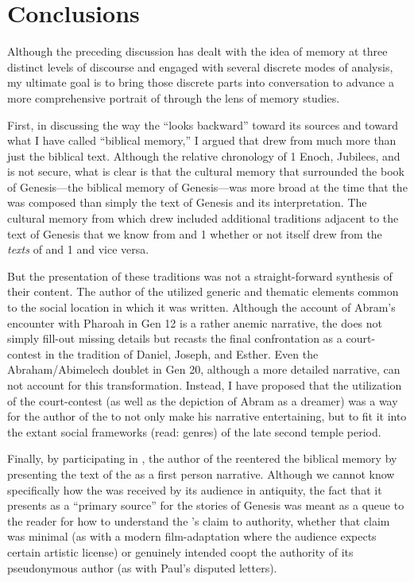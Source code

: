 \section{Conclusions}

Although the preceding discussion has dealt with the idea of memory at three distinct levels of discourse and engaged with several discrete modes of analysis, my ultimate goal is to bring those discrete parts into conversation to advance a more comprehensive portrait of \ga through the lens of memory studies.

First, in discussing the way the \ga ``looks backward'' toward its sources and toward what I have called ``biblical memory,'' I argued that \ga drew from much more than just the biblical text. Although the relative chronology of 1 Enoch, Jubilees, and \ga is not secure, what is clear is that the cultural memory that surrounded the book of Genesis---the biblical memory of Genesis---was more broad at the time that the \ga was composed than simply the text of Genesis and its interpretation. The cultural memory from which \ga drew included additional traditions adjacent to the text of Genesis that we know from \jub and 1 \enoch whether or not \ga itself drew from the \emph{texts} of \jub and 1 \enoch and vice versa.

But the presentation of these traditions was not a straight-forward synthesis of their content. The author of the \ga utilized generic and thematic elements common to the social location in which it was written. Although the account of Abram's encounter with Pharoah in Gen 12 is a rather anemic narrative, the \ga does not simply fill-out missing details but recasts the final confrontation as a court-contest in the tradition of Daniel, Joseph, and Esther. Even the Abraham/Abimelech doublet in Gen 20, although a more detailed narrative, can not account for this transformation. Instead, I have proposed that the utilization of the court-contest (as well as the depiction of Abram as a dreamer) was a way for the author of the \ga to not only make his narrative entertaining, but to fit it into the extant social frameworks (read: genres) of the late second temple period.

Finally, by participating in \psy, the author of the \ga reentered the biblical memory by presenting the text of the \ga as a first person narrative. Although we cannot know specifically how the \ga was received by its audience in antiquity, the fact that it presents as a ``primary source'' for the stories of Genesis was meant as a queue to the reader for how to understand the \ga's claim to authority, whether that claim was minimal (as with a modern film-adaptation where the audience expects certain artistic license) or genuinely intended coopt the authority of its pseudonymous author (as with Paul's disputed letters).

